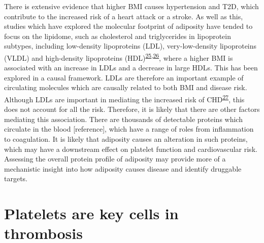 \documentclass[11pt,twoside]{bristolthesis}
\begin{document}
There is extensive evidence that higher BMI causes hypertension and T2D, which contribute to the increased risk of a heart attack or a stroke. As well as this, studies which have explored the molecular footprint of adiposity have tended to focus on the lipidome, such as cholesterol and triglycerides in lipoprotein subtypes, including low-density lipoproteins (LDL), very-low-density lipoproteins (VLDL) and high-density lipoproteins (HDL)\textsuperscript{\protect\hyperlink{ref-Bell2018a}{25},\protect\hyperlink{ref-Wurtz2014}{26}}, where a higher BMI is associated with an increase in LDLs and a decrease in large HDLs. This has been explored in a causal framework. LDLs are therefore an important example of circulating molecules which are causally related to both BMI and disease risk. Although LDLs are important in mediating the increased risk of CHD\textsuperscript{\protect\hyperlink{ref-Lu2014}{27}}, this does not account for all the risk. Therefore, it is likely that there are other factors mediating this association. There are thousands of detectable proteins which circulate in the blood {[}reference{]}, which have a range of roles from inflammation to coagulation. It is likely that adiposity causes an alteration in such proteins, which may have a downstream effect on platelet function and cardiovascular risk. Assessing the overall protein profile of adiposity may provide more of a mechanistic insight into how adiposity causes disease and identify druggable targets.

\hypertarget{platelets-are-key-cells-in-thrombosis}{%
\section{Platelets are key cells in thrombosis}\label{platelets-are-key-cells-in-thrombosis}}
\end{document}
